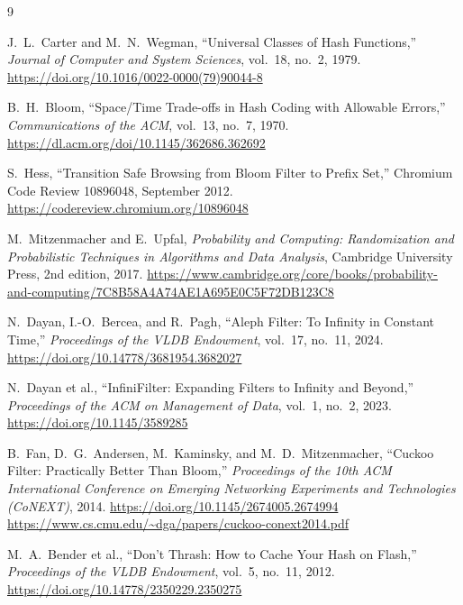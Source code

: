 \documentclass[11pt, a4paper]{report}
\theoremstyle{definition}
\begin{document}
\begin{thebibliography}{9}

  J.~L.~Carter and M.~N.~Wegman,
  ``Universal Classes of Hash Functions,''
  \textit{Journal of Computer and System Sciences}, vol.~18, no.~2, 1979.
  \url{https://doi.org/10.1016/0022-0000(79)90044-8}

  B.~H.~Bloom,
  ``Space/Time Trade-offs in Hash Coding with Allowable Errors,''
  \textit{Communications of the ACM}, vol.~13, no.~7, 1970.
  \url{https://dl.acm.org/doi/10.1145/362686.362692}

  S.~Hess,
  ``Transition Safe Browsing from Bloom Filter to Prefix Set,''
  Chromium Code Review 10896048, September 2012.
  \url{https://codereview.chromium.org/10896048}

  M.~Mitzenmacher and E.~Upfal,
  \textit{Probability and Computing: Randomization and Probabilistic 
  Techniques in Algorithms and Data Analysis},
  Cambridge University Press, 2nd edition, 2017.
  \url{https://www.cambridge.org/core/books/probability-and-computing/7C8B58A4A74AE1A695E0C5F72DB123C8}
  
  N.~Dayan, I.-O.~Bercea, and R.~Pagh,
  ``Aleph Filter: To Infinity in Constant Time,''
  \textit{Proceedings of the VLDB Endowment}, vol.~17, no.~11, 2024.
  \url{https://doi.org/10.14778/3681954.3682027}

  N.~Dayan et al.,
  ``InfiniFilter: Expanding Filters to Infinity and Beyond,''
  \textit{Proceedings of the ACM on Management of Data}, vol.~1, no.~2, 2023.
  \url{https://doi.org/10.1145/3589285}
  
  B.~Fan, D.~G.~Andersen, M.~Kaminsky, and M.~D.~Mitzenmacher,
  ``Cuckoo Filter: Practically Better Than Bloom,''
  \textit{Proceedings of the 10th ACM International Conference on Emerging 
  Networking Experiments and Technologies (CoNEXT)}, 2014.
  \url{https://doi.org/10.1145/2674005.2674994}
  \url{https://www.cs.cmu.edu/~dga/papers/cuckoo-conext2014.pdf}

  M.~A.~Bender et al.,
  ``Don't Thrash: How to Cache Your Hash on Flash,''
  \textit{Proceedings of the VLDB Endowment}, vol.~5, no.~11, 2012.
  \url{https://doi.org/10.14778/2350229.2350275}
\end{thebibliography}
\end{document}
